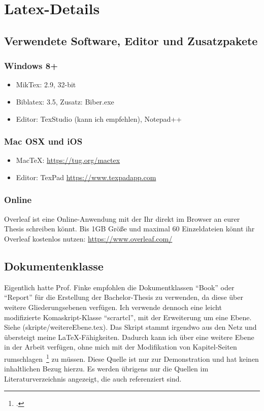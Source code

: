 \newpage
\section{Latex-Details} \label{latexDetails}

\subsection{Verwendete Software, Editor und Zusatzpakete}
\subsubsection{Windows 8+}
\begin{itemize}
\item MikTex: 2.9, 32-bit
\item Biblatex: 3.5, Zusatz: Biber.exe
\item Editor: TexStudio (kann ich empfehlen), Notepad++
\end{itemize}

\subsubsection{Mac OSX und iOS}
\begin{itemize}
\item MacTeX: \url{https://tug.org/mactex}
\item Editor: TexPad \url{https://www.texpadapp.com}
\end{itemize}

\subsubsection{Online}
Overleaf ist eine Online-Anwendung mit der Ihr direkt im Browser an eurer Thesis schreiben könnt. Bis 1GB Größe und maximal 60 Einzeldateien könnt ihr Overleaf kostenlos nutzen: \url{https://www.overleaf.com/}


\subsection{Dokumentenklasse}
Eigentlich hatte Prof. Finke empfohlen die Dokumentklassen \enquote{Book} oder \enquote{Report} für die Erstellung der Bachelor-Thesis zu verwenden, da diese über weitere Gliederungsebenen verfügen. Ich verwende dennoch eine leicht modifizierte Komaskript-Klasse \enquote{scrartcl}, mit der Erweiterung um eine Ebene. Siehe (skripte/weitereEbene.tex). Das Skript stammt irgendwo aus den Netz und übersteigt meine \LaTeX{}-Fähigkeiten. Dadurch kann ich über eine weitere Ebene in der Arbeit verfügen, ohne mich mit der Modifikation von Kapitel-Seiten rumschlagen~\footcite[Vgl. ][S. 5]{Tanenbaum.2003} zu müssen. Diese Quelle ist nur zur Demonstration und hat keinen inhaltlichen Bezug hierzu. Es werden übrigens nur die Quellen im Literaturverzeichnis angezeigt, die auch referenziert sind.


